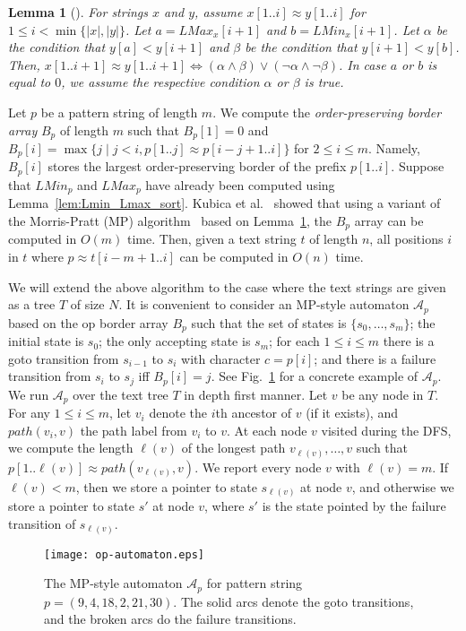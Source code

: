 \documentclass[a4paper,11pt]{article}
\newtheorem{lemma}{Lemma}
\newcommand{\Lmin}[1]{\mathit{LMin}_{#1}}
\newcommand{\Lmax}[1]{\mathit{LMax}_{#1}}
\newcommand{\Path}{\mathit{path}}
\begin{document}
\begin{lemma}[\cite{ChoNPS15}] \label{lem:Lmin_Lmax}
  For strings $x$ and $y$, assume $x[1..i] \approx y[1..i]$ for
  $1 \leq i < \min\{|x|, |y|\}$.
  Let $a = \Lmax{x}[i+1]$ and $b = \Lmin{x}[i+1]$.
  Let $\alpha$ be the condition that $y[a] < y[i+1]$
  and $\beta$ be the condition that $y[i+1] < y[b]$.
  Then, $x[1..i+1] \approx y[1..i+1] \Longleftrightarrow
  (\alpha \land \beta) \lor (\lnot \alpha \land \lnot \beta)$.
  In case $a$ or $b$ is equal to $0$,
  we assume the respective condition $\alpha$ or $\beta$ is true.
\end{lemma}

Let $p$ be a pattern string of length $m$.
We compute the \emph{order-preserving border array} $B_p$ of length $m$ such that $B_p[1] = 0$ and $B_p[i] = \max\{j \mid j < i, p[1..j] \approx p[i-j+1..i]\}$ for $2 \leq i \leq m$. Namely, $B_p[i]$ stores the largest order-preserving border of the prefix $p[1..i]$.
Suppose that $\Lmin{p}$ and $\Lmax{p}$ have already been computed
using Lemma~\ref{lem:Lmin_Lmax_sort}.
Kubica et al.~\cite{KubicaKRRW13} showed that 
using a variant of the Morris-Pratt (MP) algorithm~\cite{MorrisPratt}
based on Lemma~\ref{lem:Lmin_Lmax},
the $B_p$ array can be computed in $O(m)$ time.
Then, given a text string $t$ of length $n$,
all positions $i$ in $t$ where $p \approx t[i-m+1..i]$
can be computed in $O(n)$ time.

We will extend the above algorithm to the case where
the text strings are given as a tree $T$ of size $N$.
It is convenient to consider an MP-style automaton 
$\mathcal{A}_p$ based on the op border array $B_p$ such that
the set of states is $\{s_0, \ldots, s_m\}$;
the initial state is $s_0$;
the only accepting state is $s_m$;
for each $1 \leq i \leq m$ there is a goto transition from $s_{i-1}$ to $s_{i}$ with character $c = p[i]$;
and there is a failure transition from $s_{i}$ to $s_{j}$
iff $B_p[i] = j$.
See Fig.~\ref{fig:op-automaton} for a concrete example of $\mathcal{A}_p$.
We run $\mathcal{A}_p$ over the text tree $T$ in depth first manner.
Let $v$ be any node in $T$.
For any $1 \leq i \leq m$,
let $v_i$ denote the $i$th ancestor of $v$ (if it exists),
and $\Path(v_i,v)$ the path label from $v_i$ to $v$.
At each node $v$ visited during the DFS,
we compute the length $\ell(v)$ of the longest path $v_{\ell(v)}, \ldots, v$
such that $p[1..\ell(v)] \approx \Path(v_{\ell(v)}, v)$.
We report every node $v$ with $\ell(v) = m$.
If $\ell(v) < m$,
then we store a pointer to state $s_{\ell(v)}$ at node $v$,
and otherwise we store a pointer to state $s'$ at node $v$,
where $s'$ is the state pointed by the failure transition of $s_{\ell(v)}$.
\begin{figure}[t] 
 \centerline{
 \texttt{[image: op-automaton.eps]}
 }
 \caption{The MP-style automaton $\mathcal{A}_p$ for pattern string $p = (9, 4, 18, 2, 21, 30)$.
   The solid arcs denote the goto transitions, and the broken arcs do the failure transitions. }
\label{fig:op-automaton}
\end{figure}
\end{document}
